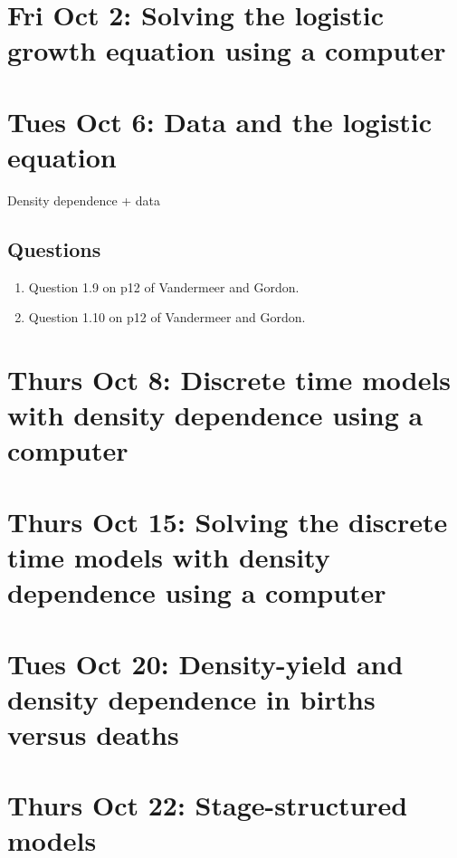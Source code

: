 \documentclass[]{book}
\providecommand{\tightlist}{%
  \setlength{\itemsep}{0pt}\setlength{\parskip}{0pt}}
\begin{document}
\chapter{Fri Oct 2: Solving the logistic growth equation using a
computer}\label{fri-oct-2-solving-the-logistic-growth-equation-using-a-computer}

\chapter{Tues Oct 6: Data and the logistic
equation}\label{tues-oct-6-data-and-the-logistic-equation}

Density dependence + data

\section{Questions}\label{questions-9}

\begin{enumerate}
\def\labelenumi{\arabic{enumi}.}
\tightlist
\item
  Question 1.9 on p12 of Vandermeer and Gordon.
\item
  Question 1.10 on p12 of Vandermeer and Gordon.
\end{enumerate}

\chapter{Thurs Oct 8: Discrete time models with density dependence using
a
computer}\label{thurs-oct-8-discrete-time-models-with-density-dependence-using-a-computer}

\chapter{Thurs Oct 15: Solving the discrete time models with density
dependence using a
computer}\label{thurs-oct-15-solving-the-discrete-time-models-with-density-dependence-using-a-computer}

\chapter{Tues Oct 20: Density-yield and density dependence in births
versus
deaths}\label{tues-oct-20-density-yield-and-density-dependence-in-births-versus-deaths}

\chapter{Thurs Oct 22: Stage-structured
models}\label{thurs-oct-22-stage-structured-models}
\end{document}
